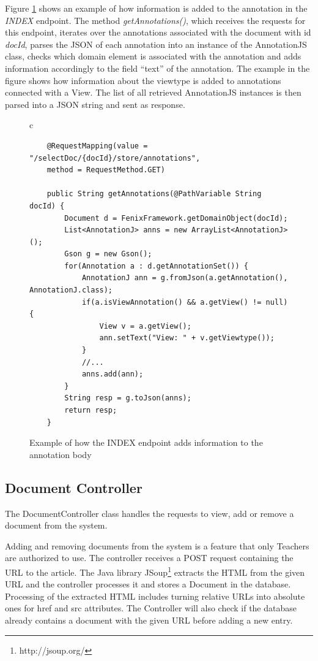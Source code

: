 Figure \ref{figure:annotationControllerIndex} shows an example of how information is added to the annotation in the \textit{INDEX} endpoint. The method \textit{getAnnotations()}, which receives the requests for this endpoint, iterates over the annotations associated with the document with id \textit{docId}, parses the JSON of each annotation into an instance of the AnnotationJS class, checks which domain element is associated with the annotation and adds information accordingly to the field ``text'' of the annotation. The example in the figure shows how information about the viewtype is added to annotations connected with a View. The list of all retrieved AnnotationJS instances is then parsed into a JSON string and sent as response.

\begin{figure}[h]
\centering
\lstset{style=customjava}
\begin{tabular}{c}
\begin{lstlisting}
	@RequestMapping(value = "/selectDoc/{docId}/store/annotations", 
	method = RequestMethod.GET)
	
	public String getAnnotations(@PathVariable String docId) {
		Document d = FenixFramework.getDomainObject(docId);
		List<AnnotationJ> anns = new ArrayList<AnnotationJ>();
		Gson g = new Gson();
		for(Annotation a : d.getAnnotationSet()) {
			AnnotationJ ann = g.fromJson(a.getAnnotation(), AnnotationJ.class);
			if(a.isViewAnnotation() && a.getView() != null) {
				View v = a.getView();
				ann.setText("View: " + v.getViewtype());
			}
			//...			
			anns.add(ann);
		}
		String resp = g.toJson(anns);
		return resp;
	}		
\end{lstlisting}
\end{tabular}
\caption{Example of how the INDEX endpoint adds information to the annotation body}
\label{figure:annotationControllerIndex}
\end{figure}

\subsection{Document Controller}
\label{subsection:documentController}
The DocumentController class handles the requests to view, add or remove a document from the system.

Adding and removing documents from the system is a feature that only Teachers are authorized to use. The controller receives a POST request containing the URL to the article. The Java library JSoup\footnote{http://jsoup.org/} extracts the HTML from the given URL and the controller processes it and stores a Document in the database. Processing of the extracted HTML includes turning relative URLs into absolute ones for href and src attributes.
The Controller will also check if the database already contains a document with the given URL before adding a new entry. 

